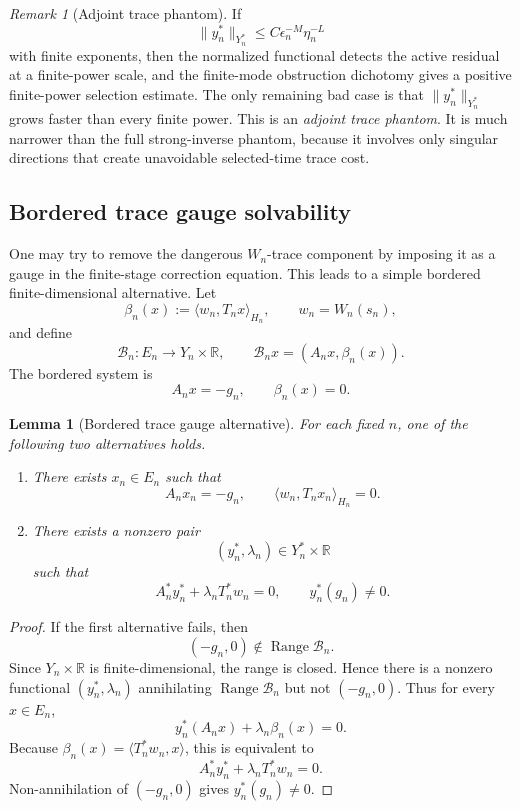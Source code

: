 \documentclass[11pt]{article}
\numberwithin{equation}{section}
\theoremstyle{plain}
\newtheorem{lemma}{Lemma}[section]
\theoremstyle{definition}
\theoremstyle{remark}
\newtheorem{remark}{Remark}[section]
\DeclareMathOperator{\Range}{Range}
\begin{document}
\begin{remark}[Adjoint trace phantom]
If
\[
        \|y_n^*\|_{Y_n^*}\le C\epsilon_n^{-M}\eta_n^{-L}
\]
with finite exponents, then the normalized functional detects the active residual at a finite-power scale, and the finite-mode obstruction dichotomy gives a positive finite-power selection estimate.  The only remaining bad case is that \(\|y_n^*\|_{Y_n^*}\) grows faster than every finite power.  This is an \emph{adjoint trace phantom}.  It is much narrower than the full strong-inverse phantom, because it involves only singular directions that create unavoidable selected-time trace cost.
\end{remark}

\subsection{Bordered trace gauge solvability}
\label{pV:sec:bordered-trace-gauge-solvability}

One may try to remove the dangerous \(W_n\)-trace component by imposing it as a gauge in the finite-stage correction equation.  This leads to a simple bordered finite-dimensional alternative.
Let
\[
        \beta_n(x):=\langle w_n,T_nx\rangle_{H_n},
        \qquad
        w_n=W_n(s_n),
\]
and define
\[
        \mathcal B_n:E_n\to Y_n\times\mathbb R,
        \qquad
        \mathcal B_nx=(A_nx,\beta_n(x)).
\]
The bordered system is
\[
        A_nx=-g_n,
        \qquad
        \beta_n(x)=0.
\]

\begin{lemma}[Bordered trace gauge alternative]
\label{pV:lem:bordered-trace-gauge-alternative}
For each fixed \(n\), one of the following two alternatives holds.
\begin{enumerate}[label=(\roman*)]
\item There exists \(x_n\in E_n\) such that
\[
        A_nx_n=-g_n,
        \qquad
        \langle w_n,T_nx_n\rangle_{H_n}=0.
\]
\item There exists a nonzero pair
\[
        (y_n^*,\lambda_n)\in Y_n^*\times\mathbb R
\]
such that
\[
        A_n^*y_n^*+\lambda_nT_n^*w_n=0,
        \qquad
        y_n^*(g_n)\ne0.
\]
\end{enumerate}
\end{lemma}

\begin{proof}
If the first alternative fails, then
\[
        (-g_n,0)\notin\Range\mathcal B_n.
\]
Since \(Y_n\times\mathbb R\) is finite-dimensional, the range is closed.  Hence there is a nonzero functional \((y_n^*,\lambda_n)\) annihilating \(\Range\mathcal B_n\) but not \((-g_n,0)\).  Thus for every \(x\in E_n\),
\[
        y_n^*(A_nx)+\lambda_n\beta_n(x)=0.
\]
Because \(\beta_n(x)=\langle T_n^*w_n,x\rangle\), this is equivalent to
\[
        A_n^*y_n^*+\lambda_nT_n^*w_n=0.
\]
Non-annihilation of \((-g_n,0)\) gives \(y_n^*(g_n)\ne0\).
\end{proof}
\end{document}
